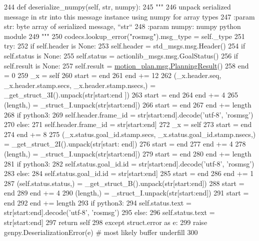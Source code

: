 \begin{DoxyCode}
244   \textcolor{keyword}{def }deserialize\_numpy(self, str, numpy):
245     \textcolor{stringliteral}{"""}
246 \textcolor{stringliteral}{    unpack serialized message in str into this message instance using numpy for array types}
247 \textcolor{stringliteral}{    :param str: byte array of serialized message, ``str``}
248 \textcolor{stringliteral}{    :param numpy: numpy python module}
249 \textcolor{stringliteral}{    """}
250     codecs.lookup\_error(\textcolor{stringliteral}{"rosmsg"}).msg\_type = self.\_type
251     \textcolor{keywordflow}{try}:
252       \textcolor{keywordflow}{if} self.header \textcolor{keywordflow}{is} \textcolor{keywordtype}{None}:
253         self.header = std\_msgs.msg.Header()
254       \textcolor{keywordflow}{if} self.status \textcolor{keywordflow}{is} \textcolor{keywordtype}{None}:
255         self.status = actionlib\_msgs.msg.GoalStatus()
256       \textcolor{keywordflow}{if} self.result \textcolor{keywordflow}{is} \textcolor{keywordtype}{None}:
257         self.result = \hyperlink{classmotion__plan_1_1msg_1_1__PlanningResult_1_1PlanningResult}{motion\_plan.msg.PlanningResult}()
258       end = 0
259       \_x = self
260       start = end
261       end += 12
262       (\_x.header.seq, \_x.header.stamp.secs, \_x.header.stamp.nsecs,) = \_get\_struct\_3I().unpack(str[start:end
      ])
263       start = end
264       end += 4
265       (length,) = \_struct\_I.unpack(str[start:end])
266       start = end
267       end += length
268       \textcolor{keywordflow}{if} python3:
269         self.header.frame\_id = str[start:end].decode(\textcolor{stringliteral}{'utf-8'}, \textcolor{stringliteral}{'rosmsg'})
270       \textcolor{keywordflow}{else}:
271         self.header.frame\_id = str[start:end]
272       \_x = self
273       start = end
274       end += 8
275       (\_x.status.goal\_id.stamp.secs, \_x.status.goal\_id.stamp.nsecs,) = \_get\_struct\_2I().unpack(str[start:
      end])
276       start = end
277       end += 4
278       (length,) = \_struct\_I.unpack(str[start:end])
279       start = end
280       end += length
281       \textcolor{keywordflow}{if} python3:
282         self.status.goal\_id.id = str[start:end].decode(\textcolor{stringliteral}{'utf-8'}, \textcolor{stringliteral}{'rosmsg'})
283       \textcolor{keywordflow}{else}:
284         self.status.goal\_id.id = str[start:end]
285       start = end
286       end += 1
287       (self.status.status,) = \_get\_struct\_B().unpack(str[start:end])
288       start = end
289       end += 4
290       (length,) = \_struct\_I.unpack(str[start:end])
291       start = end
292       end += length
293       \textcolor{keywordflow}{if} python3:
294         self.status.text = str[start:end].decode(\textcolor{stringliteral}{'utf-8'}, \textcolor{stringliteral}{'rosmsg'})
295       \textcolor{keywordflow}{else}:
296         self.status.text = str[start:end]
297       \textcolor{keywordflow}{return} self
298     \textcolor{keywordflow}{except} struct.error \textcolor{keyword}{as} e:
299       \textcolor{keywordflow}{raise} genpy.DeserializationError(e)  \textcolor{comment}{# most likely buffer underfill}
300 
\end{DoxyCode}
